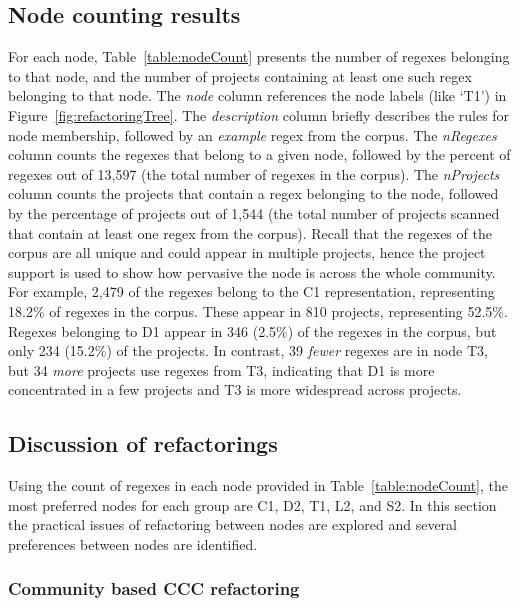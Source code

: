 \subsection{Node counting results}



For each node, Table~\ref{table:nodeCount} presents the number of regexes belonging to that node, and the number of projects containing at least one such regex belonging to that node. The \emph{node} column references the node labels (like `T1') in Figure~\ref{fig:refactoringTree}.  The \emph{description} column briefly describes the rules for node membership, followed by an \emph{example} regex from the corpus. The \emph{nRegexes} column counts the regexes that belong to a given node, followed by the percent of regexes out of 13,597 (the total number of regexes in the corpus). The \emph{nProjects} column counts the projects that contain a regex belonging to the node, followed by the percentage of projects out of 1,544 (the total number of projects scanned that contain at least one regex from the corpus). Recall that the regexes of the corpus are all unique and could appear in multiple projects, hence the project support is used to show how pervasive the node is across the whole community. For example, 2,479 of the regexes belong to the C1 representation, representing 18.2\% of regexes in the corpus. These appear in 810 projects, representing 52.5\%. Regexes belonging to D1 appear in 346 (2.5\%) of the regexes in the corpus, but only 234 (15.2\%) of the projects. In contrast, 39 \emph{fewer} regexes are in node T3, but 34 \emph{more} projects use regexes from T3, indicating that D1 is more concentrated in a few projects and T3 is more widespread across projects.

\subsection{Discussion of refactorings}
Using the count of regexes in each node provided in Table~\ref{table:nodeCount}, the most preferred nodes for each group are C1, D2, T1, L2, and S2.  In this section the practical issues of refactoring between nodes are explored and several preferences between nodes are identified.

\subsubsection{Community based CCC refactoring}

